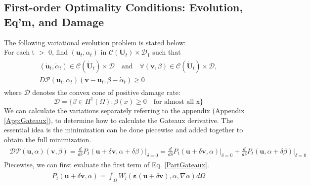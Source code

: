 \documentclass[12pt,3p]{article}
\numberwithin{equation}{section}
\begin{document}
\subsection{First-order Optimality Conditions: Evolution, Eq'm, and Damage}
The following variational evolution problem is stated below: \\
For each t $>$ 0, find $(\mathbf{u}_t, \alpha_t)$ in $\mathcal{C} (\mathbf{U}_t) \times \mathcal{D}_1$ such that 
\begin{align}\label{statementVarProblem}
\begin{split}
(\dot{\mathbf{u}}_t, \dot{\alpha}_t) \in \mathcal{C} (\dot{\mathbf{U}}_t) \times \mathcal{D} \quad \text{and} \quad \forall (\mathbf{v}, \beta) \in \mathcal{C} (\dot{\mathbf{U}}_t) \times \mathcal{D}, \\
D \mathcal{P} (\mathbf{u}_t, \alpha_t) (\mathbf{v} - \dot{\mathbf{u}}_t, \beta - \dot{\alpha}_t) \geq 0
\end{split}
\end{align} 
where $\mathcal{D}$ denotes the convex cone of positive damage rate:
\begin{equation*}
\mathcal{D} = \big\{ \beta \in H^1 (\Omega) : \beta(x) \geq 0 \quad \text{for almost all x} \big\} 
\end{equation*}
We can calculate the variations separately referring to the appendix (Appendix \ref{App:Gateaux}), to determine how to calculate the Gateaux derivative. The essential idea is the minimization can be done piecewise and added together to obtain the full minimization. 
\begin{align}\label{PartGateaux}
\begin{split}
\mathcal{D} \mathcal{P} (\mathbf{u}, \alpha) (\mathbf{v}, \beta) = \frac{d}{d \delta} P_t (\mathbf{u} + \delta \mathbf{v}, \alpha + \delta \beta) \bigg\rvert_{\delta = 0} = \frac{d}{d \delta} P_t (\mathbf{u}+ \delta \mathbf{v}, \alpha) \bigg\rvert_{\delta = 0} + \frac{d}{d \delta} P_t (\mathbf{u}, \alpha + \delta \beta) \bigg\rvert_{\delta = 0}
\end{split}
\end{align}
Piecewise, we can first evaluate the first term of Eq. \ref{PartGateaux}. 
\begin{align*}
\begin{split}
P_t (\mathbf{u}+ \delta \mathbf{v}, \alpha) = \int_{\Omega} W_l (\boldsymbol{\varepsilon}(\mathbf{u} + \delta \mathbf{v}), \alpha, \nabla \alpha) d \Omega
\end{split}
\end{align*}
\end{document}
